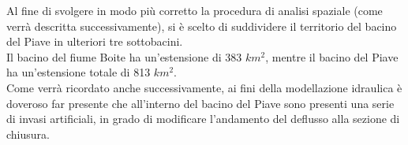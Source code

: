 Al fine di svolgere in modo più corretto la procedura di analisi spaziale (come verrà descritta successivamente), si è scelto di suddividere il territorio del bacino del Piave in ulteriori tre sottobacini.\\
Il bacino del fiume Boite ha un'estensione di 383 $km^2$, mentre il bacino del Piave ha un'estensione totale di 813 $km^2$.\\
Come verrà ricordato anche successivamente, ai fini della modellazione idraulica è doveroso far presente che all'interno del bacino del Piave sono presenti una serie di invasi artificiali, in grado di modificare l'andamento del deflusso alla sezione di chiusura.